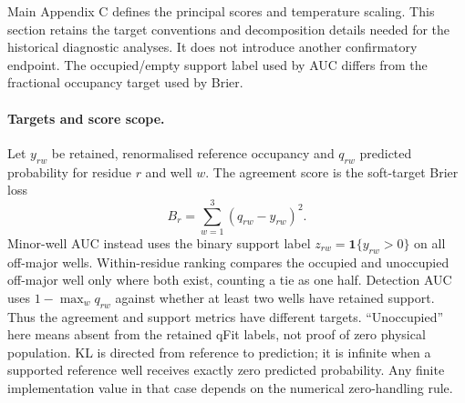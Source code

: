 \documentclass[10pt,a4paper]{article}
\begin{document}
Main Appendix C defines the principal scores and temperature scaling. This section retains the target conventions and decomposition details needed for the historical diagnostic analyses. It does not introduce another confirmatory endpoint. The occupied/empty support label used by AUC differs from the fractional occupancy target used by Brier.

\paragraph{Targets and score scope.} Let $y_{rw}$ be retained, renormalised
reference occupancy and $q_{rw}$ predicted probability for residue $r$ and well
$w$. The agreement score is the soft-target Brier loss
\[
 B_r=\sum_{w=1}^{3}(q_{rw}-y_{rw})^2.
\]
Minor-well AUC instead uses the binary support label
$z_{rw}=\mathbf{1}\{y_{rw}>0\}$ on all off-major wells. Within-residue ranking
compares the occupied and unoccupied off-major well only where both exist,
counting a tie as one half. Detection AUC uses $1-\max_w q_{rw}$ against whether
at least two wells have retained support. Thus the agreement and support metrics
have different targets. ``Unoccupied'' here means absent from the retained qFit
labels, not proof of zero physical population. KL is directed from reference to
prediction; it is infinite when a supported reference well receives exactly zero
predicted probability. Any finite implementation value in that case depends on
the numerical zero-handling rule.
\end{document}
